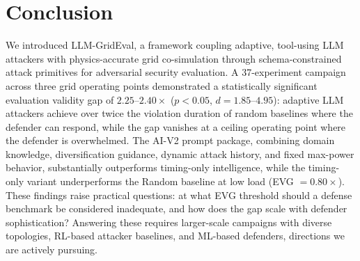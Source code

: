 \section{Conclusion}
\label{sec:conclusion}

We introduced LLM-GridEval, a framework coupling adaptive, tool-using LLM attackers with physics-accurate grid co-simulation through schema-constrained attack primitives for adversarial security evaluation.
A 37-experiment campaign across three grid operating points demonstrated a statistically significant evaluation validity gap of $2.25$--$2.40\times$ ($p < 0.05$, $d = 1.85$--$4.95$): adaptive LLM attackers achieve over twice the violation duration of random baselines where the defender can respond, while the gap vanishes at a ceiling operating point where the defender is overwhelmed.
The AI-V2 prompt package, combining domain knowledge, diversification guidance, dynamic attack history, and fixed max-power behavior, substantially outperforms timing-only intelligence, while the timing-only variant underperforms the Random baseline at low load (EVG $= 0.80\times$). These findings raise practical questions: at what EVG threshold should a defense benchmark be considered inadequate, and how does the gap scale with defender sophistication? Answering these requires larger-scale campaigns with diverse topologies, RL-based attacker baselines, and ML-based defenders, directions we are actively pursuing.
